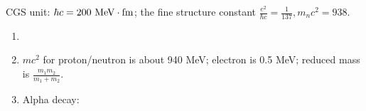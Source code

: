 \documentclass{school-22.101-notes}
\date{December 13, 2011}
\begin{document}
\maketitle



CGS unit: $\hbar c = 200 \mbox{ } \mathrm{MeV} \cdot \mathrm{fm}$; the fine structure constant $\frac{e^2}{\hbar c} = \frac{1}{137}, m_n c^2 = 938.$
\begin{enumerate}
\item 
{}
\item $mc^2$ for proton/neutron is about 940 MeV; electron is 0.5 MeV; reduced mass is $\frac{m_1 m_2}{m_1 + m_2}$. 
\item Alpha decay:
\end{enumerate}
\end{document}
